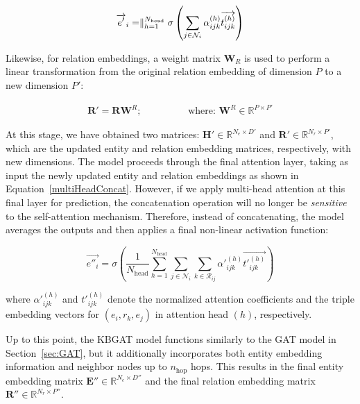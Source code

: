\begin{equation}
	\label{eq:graphAttention1}
	\overrightarrow{e'}_i=\bigparallel_{h=1}^{N_{\text{head}}} \sigma\left(\sum_{j\in \mathcal{N}_i}\alpha_{ijk}^{(h)} \overrightarrow{t^{(h)}_{ijk}}\right)
\end{equation}

Likewise, for relation embeddings, a weight matrix $\mathbf{W}_R$ is used to perform a linear transformation from the original relation embedding of dimension $P$ to a new dimension $P'$:

\begin{align}
	\mathbf{R'} = \mathbf{R} \mathbf{W}^R; \hspace{2cm} \text{where: } \mathbf{W}^R \in \mathbb{R}^{P \times P'}
\end{align}





At this stage, we have obtained two matrices: $\mathbf{H}' \in \mathbb{R}^{N_e \times D'}$ and $\mathbf{R}' \in \mathbb{R}^{N_r \times P'}$, which are the updated entity and relation embedding matrices, respectively, with new dimensions. The model proceeds through the final attention layer, taking as input the newly updated entity and relation embeddings as shown in Equation~\ref{multiHeadConcat}. However, if we apply multi-head attention at this final layer for prediction, the concatenation operation will no longer be \textit{sensitive} to the self-attention mechanism. Therefore, instead of concatenating, the model averages the outputs and then applies a final non-linear activation function:

\begin{equation}
	\label{eq:graphAttention2}
	\overrightarrow{e''_{i}}=\sigma\left(\frac{1}{N_{\text{head}}} \sum_{h=1}^{N_{\text{head}}} \sum_{j \in \mathcal{N}_i} \sum_{k \in \mathcal{R}_{ij}} \alpha'^{(h)}_{ijk} \overrightarrow{t'^{(h)}_{ijk}} \right)
\end{equation}

where $\alpha'^{(h)}_{ijk}$ and $t'^{(h)}_{ijk}$ denote the normalized attention coefficients and the triple embedding vectors for $(e_i, r_k, e_j)$ in attention head $(h)$, respectively.

Up to this point, the KBGAT model functions similarly to the GAT model in Section~\ref{sec:GAT}, but it additionally incorporates both entity embedding information and neighbor nodes up to $n_{\text{hop}}$ hops. This results in the final entity embedding matrix $\mathbf{E}'' \in \mathbb{R}^{N_e \times D''}$ and the final relation embedding matrix $\mathbf{R}'' \in \mathbb{R}^{N_r \times P''}$. 

